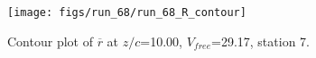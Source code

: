 \begin{figure}[H]
\centering
\texttt{[image: figs/run\_68/run\_68\_R\_contour]}
\caption{Contour plot of $\overline{r}$ at $z/c$=10.00, $V_{free}$=29.17, station 7.}
\end{figure}



